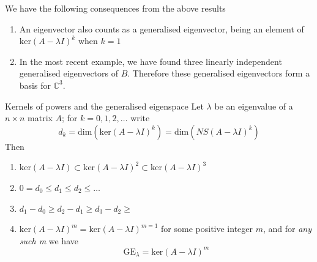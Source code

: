 \documentclass[journal, letterpaper]{IEEEtran}
\begin{document}
    We have the following consequences from the above results
    \begin{enumerate}
        \item An eigenvector also counts as a generalised eigenvector, being an element of $\text{ker}(A - \lambda I)^k$ when $k = 1$
        \item In the most recent example, we have found three linearly independent generalised eigenvectors of $B$. Therefore these generalised eigenvectors form a basis for $\mathbb{C}^3$.
    \end{enumerate}
    \begin{mybox}{Kernels of powers and the generalised eigenspace}
        Let $\lambda$ be an eigenvalue of a $n \times n$ matrix $A$; for $k = 0, 1, 2, \dots$ write
        $$d_k = \text{dim}(\text{ker}(A - \lambda I)^k) = \text{dim}(NS(A - \lambda I)^k)$$
        Then
        \begin{enumerate}
            \item $\text{ker}(A -\lambda I) \subset \text{ker}(A - \lambda I)^2 \subset \text{ker}(A - \lambda I )^3$
            \item $0 = d_0 \le d_1 \le d_2 \le \dots$
            \item $d_1 - d_0 \ge d_2 - d_1 \ge d_3 - d_2 \ge$
            \item $\text{ker}(A - \lambda I)^m = \text{ker}(A-\lambda I)^{m=1}$ for some positive integer $m$, and for \textit{any such m} we have
            $$ \text{GE}_\lambda = \text{ker}(A - \lambda I)^m$$
        \end{enumerate}
    \end{mybox}
\end{document}
